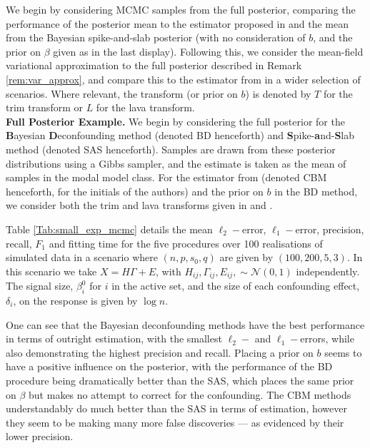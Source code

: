 \documentclass[11pt]{article}
\newcommand{\subparspace}{\vspace{3mm} \\}
\begin{document}
We begin by considering MCMC samples from the full posterior, comparing the performance of the posterior mean to the estimator proposed in \cite{CBM2020} and the mean from the Bayesian spike-and-slab posterior (with no consideration of $b$, and the prior on $\beta$ given as in the last display). Following this, we consider the mean-field variational approximation to the full posterior described in Remark \ref{rem:var_approx}, and compare this to the estimator from \cite{CBM2020} in a wider selection of scenarios. Where relevant, the transform (or prior on $b$) is denoted by $T$ for the trim transform or $L$ for the lava transform.
\subparspace
{\bf Full Posterior Example.}
We begin by considering the full posterior for the {\bf B}ayesian {\bf D}econfounding method (denoted BD henceforth) and {\bf S}pike-{\bf a}nd-{\bf S}lab method (denoted SAS henceforth). Samples are drawn from these posterior distributions using a Gibbs sampler, and the estimate is taken as the mean of samples in the modal model class. For the estimator from \cite{CBM2020} (denoted CBM henceforth, for the initials of the authors) and the prior on $b$ in the BD method, we consider both the trim and lava transforms given in \cite{CBM2020} and \cite{Chernozhukov2017}.

 Table \ref{Tab:small_exp_mcmc} details the mean $\ell_2-$error, $\ell_1-$error, precision, recall, $F_1$ and fitting time for the five procedures over 100 realisations of simulated data in a scenario where $(n, p, s_0, q)$ are given by $(100, 200, 5, 3)$. In this scenario we take $X = H \Gamma + E$, with $H_{ij}, \Gamma_{ij}, E_{ij}, \sim \mathcal{N}(0, 1)$ independently. The signal size, $\beta_i^0$ for $i$ in the active set, and the size of each confounding effect, $\delta_i$, on the response is given by $\log n$. 
 
 One can see that the Bayesian deconfounding methods have the best performance in terms of outright estimation, with the smallest $\ell_2-$ and $\ell_1-$errors, while also demonstrating the highest precision and recall. Placing a prior on $b$ seems to have a positive influence on the posterior, with the performance of the BD procedure being dramatically better than the SAS, which places the same prior on $\beta$ but makes no attempt to correct for the confounding. The CBM methods understandably do much better than the SAS in terms of estimation, however they seem to be making many more false discoveries --- as evidenced by their lower precision. 
  
\end{document}
